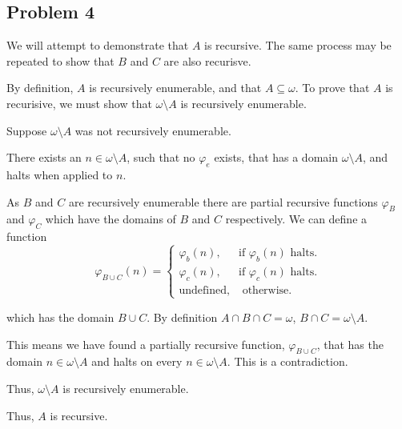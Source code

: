 \documentclass[a4paper]{article}
\begin{document}


\subsection*{Problem 4}

We will attempt to demonstrate that $A$ is recursive. The same process may be repeated to show that $B$ and $C$ are also recurisve.

By definition, $A$ is recursively enumerable, and that $A \subseteq \omega$. To prove that $A$ is recurisive, we must show that  $\omega \setminus A$ is recursively enumerable.

    Suppose $\omega \setminus A$ was not recursively enumerable.

    There exists an $n \in \omega \setminus A$, such that no $\varphi_e$ exists, that has a domain $\omega \setminus A$, and halts when applied to $n$.

    As $B$ and $C$ are recursively enumerable there are partial recursive functions $\varphi_B$ and $\varphi_C$ which have the domains of $B$ and $C$ respectively. We can define a function 
    $$
    \varphi_{B \cup C}(n) = 
    \begin{cases}
        \varphi_b(n), &\mbox{if } \varphi_b(n) \text{ halts.}\\
        \varphi_c(n), &\mbox{if } \varphi_c(n) \text{ halts.}\\
        \text{undefined,} &\mbox{ otherwise.} 
    \end{cases} 
    $$

    which has the domain $B \cup C$. By definition $A \cap B \cap C = \omega$, $B \cap C = \omega \setminus A$.

    This means we have found a partially recursive function, $\varphi_{B \cup C}$, that has the domain $n \in \omega \setminus A$ and halts on every $n \in \omega \setminus A$. This is a contradiction.

    Thus, $\omega \setminus A$ is recursively enumerable.

    Thus, $A$ is recursive.
    
\end{document}
